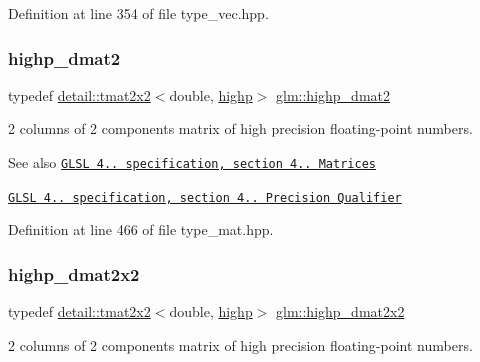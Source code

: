 Definition at line 354 of file type\+\_\+vec.\+hpp.

\mbox{\label{group__core__precision_ga9b158b3b722fe991bb66f7e65f136e68}} 
\subsubsection{\texorpdfstring{highp\+\_\+dmat2}{highp\_dmat2}}
{\footnotesize\ttfamily typedef \hyperlink{structglm_1_1detail_1_1tmat2x2}{detail\+::tmat2x2}$<$double, \hyperlink{namespaceglm_a0f04f086094c747d227af4425893f545ac6f7eab42eacbb10d59a58e95e362074}{highp}$>$ \hyperlink{group__core__precision_ga9b158b3b722fe991bb66f7e65f136e68}{glm\+::highp\+\_\+dmat2}}

2 columns of 2 components matrix of high precision floating-\/point numbers.

\begin{DoxySeeAlso}{See also}
\href{http://www.opengl.org/registry/doc/GLSLangSpec.4.20.8.pdf}{\tt G\+L\+SL 4.. specification, section 4.. Matrices} 

\href{http://www.opengl.org/registry/doc/GLSLangSpec.4.20.8.pdf}{\tt G\+L\+SL 4.. specification, section 4.. Precision Qualifier} 
\end{DoxySeeAlso}


Definition at line 466 of file type\+\_\+mat.\+hpp.

\mbox{\label{group__core__precision_gaa5e35f6570d394c1cd34f411a473220c}} 
\subsubsection{\texorpdfstring{highp\+\_\+dmat2x2}{highp\_dmat2x2}}
{\footnotesize\ttfamily typedef \hyperlink{structglm_1_1detail_1_1tmat2x2}{detail\+::tmat2x2}$<$double, \hyperlink{namespaceglm_a0f04f086094c747d227af4425893f545ac6f7eab42eacbb10d59a58e95e362074}{highp}$>$ \hyperlink{group__core__precision_gaa5e35f6570d394c1cd34f411a473220c}{glm\+::highp\+\_\+dmat2x2}}

2 columns of 2 components matrix of high precision floating-\/point numbers.

